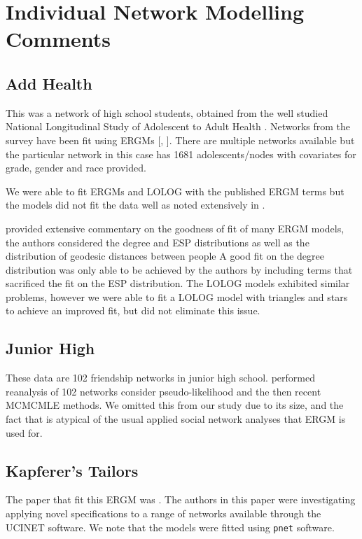 \documentclass[
]{statsoc}
\begin{document}
\section{Individual Network Modelling Comments}\label{app:comments}

\subsection{Add Health}

This was a network of high school students, obtained from the well
studied National Longitudinal Study of Adolescent to Adult Health
\citep{AddHealth2007}. Networks from the survey have been fit using
ERGMs {[}\cite{Goodreau2007}, \cite{Hunter_Goodreau_2008}{]}. There are
multiple networks available but the particular network in this case has
1681 adolescents/nodes with covariates for grade, gender and race
provided.

We were able to fit ERGMs and LOLOG with the published ERGM terms but
the models did not fit the data well as noted extensively in
\cite{Goodreau2007}.

\cite{Goodreau2007} provided extensive commentary on the goodness of fit
of many ERGM models, the authors considered the degree and ESP
distributions as well as the distribution of geodesic distances between
people A good fit on the degree distribution was only able to be
achieved by the authors by including terms that sacrificed the fit on
the ESP distribution. The LOLOG models exhibited similar problems,
however we were able to fit a LOLOG model with triangles and stars to
achieve an improved fit, but did not eliminate this issue.

\subsection{Junior High}

These data are 102 friendship networks in junior high school.
\cite{Lubbers2007} performed reanalysis of 102 networks consider
pseudo-likelihood and the then recent MCMCMLE methods. We omitted this
from our study due to its size, and the fact that is atypical of the
usual applied social network analyses that ERGM is used for.

\subsection{Kapferer's Tailors}

The paper that fit this ERGM was \cite{Robins2007}. The authors in this
paper were investigating applying novel specifications to a range of
networks available through the UCINET software. We note that the models
were fitted using \texttt{pnet} software.
\end{document}
